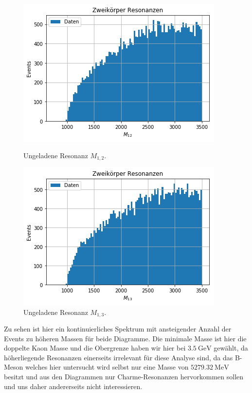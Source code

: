 \begin{figure}[htb]
  \centering
    \includegraphics[width=\linewidth]{plots/sim_twobody_resonance_m12.png}
    \caption{Ungeladene Resonanz $M_{1,2}$.\label{fig:m12}}
  \endminipage\hfill
    \includegraphics[width=\linewidth]{plots/sim_twobody_resonance_m13.png}
    \caption{Ungeladene Resonanz $M_{1,3}$.\label{fig:m13}}
  \endminipage
  \label{fig:resonances}
\end{figure}
Zu sehen ist hier ein kontinuierliches Spektrum mit ansteigender Anzahl der Events zu h\"oheren Massen f\"ur beide Diagramme.
Die minimale Masse ist hier die doppelte Kaon Masse und die Obergrenze haben wir hier bei $\SI{3.5}{\giga\electronvolt}$ gew\"ahlt, da h\"oherliegende Resonanzen einerseits irrelevant f\"ur diese Analyse sind, da das B-Meson welches hier untersucht wird selbst nur eine Masse von $\SI{5279.32}{\mega\electronvolt}$ besitzt und aus den Diagrammen nur Charme-Resonanzen hervorkommen sollen und uns daher andererseits nicht interessieren.

